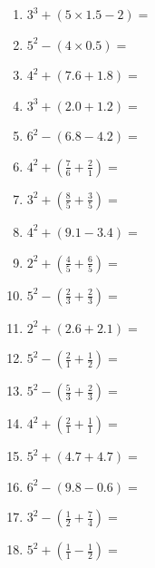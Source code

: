 \documentclass[12pt]{article}
\begin{document}
    \begin{enumerate}
\item \large $ 3^{3} + (5 \times 1.5 - 2) = $ \vspace{1.4cm}
\item \large $ 5^{2} - (4 \times 0.5) = $ \vspace{1.4cm}
\item \large $ 4^{2} + (7.6 + 1.8) = $ \vspace{1.4cm}
\item \large $ 3^{3} + (2.0 + 1.2) = $ \vspace{1.4cm}
\item \large $ 6^{2} - (6.8 - 4.2) = $ \vspace{1.4cm}
\item \large $ 4^{2} + (\frac{7}{6} + \frac{2}{1}) = $ \vspace{1.4cm}
\item \large $ 3^{2} + (\frac{8}{5} + \frac{3}{5}) = $ \vspace{1.4cm}
\item \large $ 4^{2} + (9.1 - 3.4) = $ \vspace{1.4cm}
\newpage
\item \large $ 2^{2} + (\frac{4}{5} + \frac{6}{5}) = $ \vspace{1.4cm}
\item \large $ 5^{2} - (\frac{2}{3} + \frac{2}{3}) = $ \vspace{1.4cm}
\item \large $ 2^{2} + (2.6 + 2.1) = $ \vspace{1.4cm}
\item \large $ 5^{2} - (\frac{2}{1} + \frac{1}{2}) = $ \vspace{1.4cm}
\item \large $ 5^{2} - (\frac{5}{3} + \frac{2}{3}) = $ \vspace{1.4cm}
\item \large $ 4^{2} + (\frac{2}{1} + \frac{1}{1}) = $ \vspace{1.4cm}
\item \large $ 5^{2} + (4.7 + 4.7) = $ \vspace{1.4cm}
\item \large $ 6^{2} - (9.8 - 0.6) = $ \vspace{1.4cm}
\item \large $ 3^{2} - (\frac{1}{2} + \frac{7}{4}) = $ \vspace{1.4cm}
\item \large $ 5^{2} + (\frac{1}{1} - \frac{1}{2}) = $ \vspace{1.4cm}

\end{enumerate}
\end{document}
